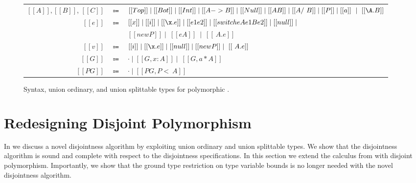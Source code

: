 \begin{figure}[t]
  \begin{small}
      \begin{center}
        \begin{tabular}{rcl}
          \toprule
          $[[A]], [[B]]$, $[[C]]$ & $\Coloneqq$ & $ [[Top]] \mid [[Bot]] \mid [[Int]] \mid [[A -> B]] \mid [[Null]] \mid [[A \/ B]] \mid [[A /\ B]] \mid [[P]] \mid [[a]] ~ \mid ~ [[\A . B]] $ \\
          $[[e]]$ & $\Coloneqq$ & $ [[x]] \mid [[i]] \mid [[\x.e]] \mid [[e1 e2]] \mid [[switch e A e1 B e2]] \mid [[null]] \mid$ \\
                  &             & $[[new P]] \mid ~ [[e A]] ~ \mid ~ [[\ A . e]] $\\
          $[[v]]$ & $\Coloneqq$ & $ [[i]] \mid [[\x.e]] \mid [[null]] \mid [[new P]] \mid ~ [[\ A . e]] $\\
          $[[G]]$ & $\Coloneqq$ & $ \cdot \mid [[G , x : A]] \mid ~ [[G , a * A]] $ \\
          $[[PG]]$ & $\Coloneqq$ & $ \cdot \mid [[PG , P <~ A]]$ \\
          \bottomrule
        \end{tabular}
      \end{center}
    \end{small}

  \begin{small}
    \centering
  \end{small}
  \caption{Syntax, union ordinary, and union splittable types for polymorphic \name.}
  \label{fig:union:rev:poly:uo}
\end{figure}







\section{Redesigning Disjoint Polymorphism}
\label{sec:rev:disjoint:disjpoly}
In  we discuss 
a novel disjointness algorithm by exploiting 
union ordinary and union splittable types.
We show that the disjointness algorithm is sound and
complete with respect to the disjointness specifications.
In this section we extend the calculus from 
 with disjoint
polymorphism. Importantly, we show that the ground type 
restriction on type variable bounds is no longer needed 
with the novel disjointness algorithm.

